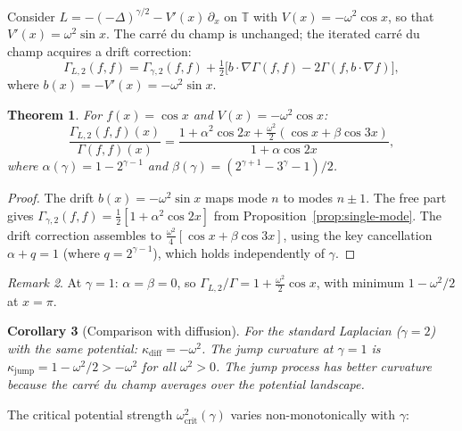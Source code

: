 \documentclass[11pt,a4paper]{article}
\theoremstyle{plain}
\newtheorem{theorem}{Theorem}[section]
\newtheorem{corollary}[theorem]{Corollary}
\theoremstyle{definition}
\theoremstyle{remark}
\newtheorem{remark}[theorem]{Remark}
\newcommand{\T}{\mathbb{T}}
\begin{document}
Consider $L = -(-\Delta)^{\gamma/2} - V'(x)\,\partial_x$ on $\T$
with $V(x) = -\omega^2\cos x$, so that
$V'(x) = \omega^2\sin x$. The carr\'e du champ is unchanged;
the iterated carr\'e du champ acquires a drift correction:
\begin{equation}\label{eq:G2-drift}
  \Gamma_{L,2}(f,f) = \Gamma_{\gamma,2}(f,f)
  + \tfrac{1}{2}\bigl[
    b \cdot \nabla\Gamma(f,f) - 2\Gamma(f, b \cdot \nabla f)
  \bigr],
\end{equation}
where $b(x) = -V'(x) = -\omega^2\sin x$.

\begin{theorem}\label{thm:potential}
For $f(x) = \cos x$ and $V(x) = -\omega^2\cos x$:
\begin{equation}\label{eq:G2-ratio-potential}
  \frac{\Gamma_{L,2}(f,f)(x)}{\Gamma(f,f)(x)}
  = \frac{1 + \alpha^2\cos 2x + \tfrac{\omega^2}{2}(\cos x + \beta\cos 3x)}
         {1 + \alpha\cos 2x},
\end{equation}
where
$\alpha(\gamma) = 1 - 2^{\gamma-1}$ and
$\beta(\gamma) = (2^{\gamma+1} - 3^\gamma - 1)/2$.
\end{theorem}

\begin{proof}
The drift $b(x) = -\omega^2\sin x$ maps mode $n$ to modes $n \pm 1$.
The free part gives
$\Gamma_{\gamma,2}(f,f) = \frac{1}{2}[1 + \alpha^2\cos 2x]$
from Proposition~\ref{prop:single-mode}.
The drift correction assembles to
$\frac{\omega^2}{4}[\cos x + \beta\cos 3x]$,
using the key cancellation $\alpha + q = 1$ (where $q = 2^{\gamma-1}$),
which holds independently of $\gamma$.
\end{proof}

\begin{remark}
At $\gamma = 1$: $\alpha = \beta = 0$, so
$\Gamma_{L,2}/\Gamma = 1 + \frac{\omega^2}{2}\cos x$,
with minimum $1 - \omega^2/2$ at $x = \pi$.
\end{remark}

\begin{corollary}[Comparison with diffusion]\label{cor:comparison}
For the standard Laplacian ($\gamma = 2$) with the same potential:
$\kappa_{\mathrm{diff}} = -\omega^2$.
The jump curvature at $\gamma = 1$ is
$\kappa_{\mathrm{jump}} = 1 - \omega^2/2 > -\omega^2$
for all $\omega^2 > 0$. The jump process has better curvature because
the carr\'e du champ averages over the potential landscape.
\end{corollary}

The critical potential strength $\omega^2_{\mathrm{crit}}(\gamma)$
varies non-monotonically with $\gamma$:
\end{document}
